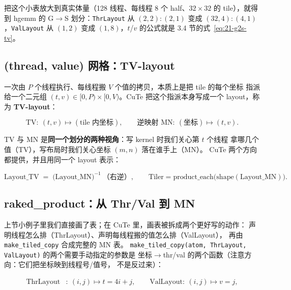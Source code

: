 把这个小表放大到真实体量（128 线程、每线程 8 个
half、$32\times32$ 的 tile），就得到 hgemm 的 G$\to$S 划分：\texttt{ThrLayout}
从 $(2,2){:}(2,1)$ 变成 $(32,4){:}(4,1)$，\texttt{ValLayout} 从 $(1,2)$ 变成
$(1,8)$，$t$/$v$ 的公式就是 3.4 节的式~\eqref{eq:21-g2s-tv}。

\subsection{(thread, value) 网格：TV-layout}

一次由 $P$ 个线程执行、每线程搬 $V$ 个值的拷贝，本质上是把 tile 的每个坐标
指派给一个二元组 $(t,v)\in[0,P)\times[0,V)$。CuTe 把这个指派本身写成一个
layout，称为 \textbf{TV-layout}：

\begin{equation}
  \mathrm{TV}:\ (t,v) \longmapsto (\text{tile 内坐标}), \qquad
  \text{逆映射 } \mathrm{MN}:\ (\text{坐标}) \longmapsto (t,v) .
  \label{eq:21-tv}
\end{equation}

TV 与 MN 是\textbf{同一个划分的两种视角}：写 kernel 时我们关心第 $t$ 个线程
拿哪几个值（TV），写布局时我们关心坐标 $(m,n)$ 落在谁手上（MN）。
CuTe 两个方向都提供，并且用同一个 layout 表示：

\begin{equation}
  \mathrm{Layout\_TV} \;=\; \bigl(\mathrm{Layout\_MN}\bigr)^{-1}
  \ \text{（右逆）}, \qquad
  \mathrm{Tiler} = \mathrm{product\_each}\bigl(\mathrm{shape}(\mathrm{Layout\_MN})\bigr) .
  \label{eq:21-mn-tv}
\end{equation}

\subsection{raked\_product：从 Thr/Val 到 MN}

上节小例子里我们直接画了表；在 CuTe 里，画表被拆成两个更好写的动作：
声明线程怎么排（ThrLayout）、声明每线程搬的值怎么排（ValLayout），
再由 \texttt{make\_\allowbreak{}tiled\_\allowbreak{}copy} 合成完整的 MN 表。
\texttt{make\_\allowbreak{}tiled\_\allowbreak{}copy\allowbreak{}(atom,\allowbreak{} Thr\allowbreak{}Layout,\allowbreak{} Val\allowbreak{}Layout)} 的两个需要手动指定的参数是
坐标$\to$thr/val 的两个函数（注意方向：它们把坐标映到线程号/值号，
不是反过来）：

\begin{align}
  \mathrm{ThrLayout}&:\ (i,j) \longmapsto t = 4i + j, \qquad
  \mathrm{ValLayout}:\ (i,j) \longmapsto v = j , \label{eq:21-g2s-params}
\end{align}

